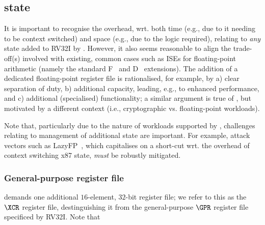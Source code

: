 \subsection{\XCID state}
\label{sec:spec:state}

It is important to recognise the overhead, wrt. both 
time (e.g., due to it needing to be context switched) 
and 
space (e.g., due to the logic required),
relating to {\em any} state added to RV32I by \XCID.
However, it also seems reasonable to align the trade-off(s) involved with 
existing, common cases such as ISEs for floating-point arithmetic (namely
the standard 
F~\cite[Section 8]{SCARV:RV:ISA:I:17}
and
D~\cite[Section 9]{SCARV:RV:ISA:I:17}
extensions).  The addition of a dedicated floating-point register file is
rationalised, for example, by
a) clear separation of duty,
b) additional capacity, leading, e.g., to enhanced performance,
   and
c) additional (specialised) functionality;
a similar argument is true of \XCID, but motivated by a different context
(i.e., cryptographic vs. floating-point workloads).

Note that, particularly due to the nature of workloads supported by \XCID,
challenges relating to management of additional state are important.  For
example, attack vectors such as 
LazyFP~\cite{SCARV:StePre:18}, 
which capitalises on a short-cut wrt. the overhead of context switching
x87 state, {\em must} be robustly mitigated.


\subsubsection{General-purpose register file}
\label{sec:spec:state:gpr}

\XCID 
demands one additional 
$16$-element, $32$-bit register file;
we refer to this as the $\XCR$ register file, destinguishing it from the
general-purpose $\GPR$ register file specificed by RV32I.
Note that


